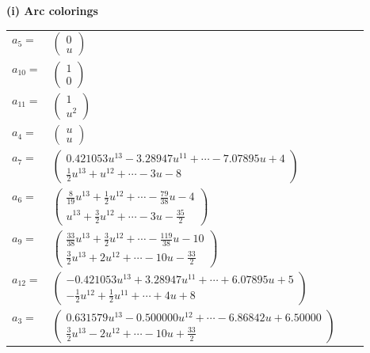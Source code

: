 \documentclass[1p]{elsarticle_modified}
\theoremstyle{definition}
\begin{document}
\flushleft \textbf{(i) Arc colorings}\\
\begin{tabular}{m{7pt} m{180pt} m{7pt} m{180pt} }
\flushright $a_{5}=$&$\begin{pmatrix}0\\u\end{pmatrix}$ \\
\flushright $a_{10}=$&$\begin{pmatrix}1\\0\end{pmatrix}$ \\
\flushright $a_{11}=$&$\begin{pmatrix}1\\u^2\end{pmatrix}$ \\
\flushright $a_{4}=$&$\begin{pmatrix}u\\u\end{pmatrix}$ \\
\flushright $a_{7}=$&$\begin{pmatrix}0.421053 u^{13}-3.28947 u^{11}+\cdots-7.07895 u+4\\\frac{1}{2} u^{13}+u^{12}+\cdots-3 u-8\end{pmatrix}$ \\
\flushright $a_{6}=$&$\begin{pmatrix}\frac{8}{19} u^{13}+\frac{1}{2} u^{12}+\cdots-\frac{79}{38} u-4\\u^{13}+\frac{3}{2} u^{12}+\cdots-3 u-\frac{35}{2}\end{pmatrix}$ \\
\flushright $a_{9}=$&$\begin{pmatrix}\frac{33}{38} u^{13}+\frac{3}{2} u^{12}+\cdots-\frac{119}{38} u-10\\\frac{3}{2} u^{13}+2 u^{12}+\cdots-10 u-\frac{33}{2}\end{pmatrix}$ \\
\flushright $a_{12}=$&$\begin{pmatrix}-0.421053 u^{13}+3.28947 u^{11}+\cdots+6.07895 u+5\\-\frac{1}{2} u^{12}+\frac{1}{2} u^{11}+\cdots+4 u+8\end{pmatrix}$ \\
\flushright $a_{3}=$&$\begin{pmatrix}0.631579 u^{13}-0.500000 u^{12}+\cdots-6.86842 u+6.50000\\\frac{3}{2} u^{13}-2 u^{12}+\cdots-10 u+\frac{33}{2}\end{pmatrix}$ \\

\end{tabular}
\end{document}
